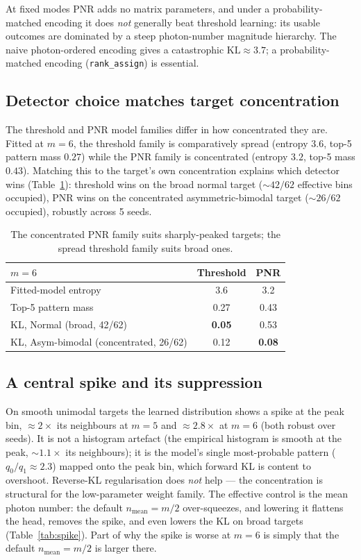 \documentclass[11pt,a4paper]{article}
\begin{document}
At fixed modes PNR adds no matrix parameters, and under a probability-matched
encoding it does \emph{not} generally beat threshold learning: its usable
outcomes are dominated by a steep photon-number magnitude hierarchy. The naive
photon-ordered encoding gives a catastrophic $\mathrm{KL}\approx3.7$; a
probability-matched encoding (\texttt{rank\_assign}) is essential.

\subsection{Detector choice matches target concentration}
\label{sec:concentration}
The threshold and PNR model families differ in how concentrated they are. Fitted
at $m=6$, the threshold family is comparatively spread (entropy $3.6$, top-5
pattern mass $0.27$) while the PNR family is concentrated (entropy $3.2$, top-5
mass $0.43$). Matching this to the target's own concentration explains which
detector wins (Table~\ref{tab:conc}): threshold wins on the broad normal target
(${\sim}42/62$ effective bins occupied), PNR wins on the concentrated
asymmetric-bimodal target (${\sim}26/62$ occupied), robustly across 5 seeds.

\begin{table}[h]
\centering
\begin{tabular}{lcc}
\toprule
$m=6$ & Threshold & PNR\\
\midrule
Fitted-model entropy        & 3.6 & 3.2\\
Top-5 pattern mass          & 0.27 & 0.43\\
\midrule
KL, Normal (broad, 42/62)          & \textbf{0.05} & 0.53\\
KL, Asym-bimodal (concentrated, 26/62) & 0.12 & \textbf{0.08}\\
\bottomrule
\end{tabular}
\caption{The concentrated PNR family suits sharply-peaked targets; the spread
threshold family suits broad ones.}
\label{tab:conc}
\end{table}

\subsection{A central spike and its suppression}
\label{sec:spike}
On smooth unimodal targets the learned distribution shows a spike at the peak
bin, ${\approx}2\times$ its neighbours at $m=5$ and ${\approx}2.8\times$ at
$m=6$ (both robust over seeds). It is not a histogram artefact (the empirical
histogram is smooth at the peak, ${\sim}1.1\times$ its neighbours); it is the
model's single most-probable pattern ($q_0/q_1\approx2.3$) mapped onto the peak
bin, which forward KL is content to overshoot. Reverse-KL regularisation does
\emph{not} help --- the concentration is structural for the low-parameter weight
family. The effective control is the mean photon number: the default
$n_{\mathrm{mean}}=m/2$ over-squeezes, and lowering it flattens the head, removes
the spike, and even lowers the KL on broad targets (Table~\ref{tab:spike}). Part
of why the spike is worse at $m=6$ is simply that the default
$n_{\mathrm{mean}}=m/2$ is larger there.
\end{document}
